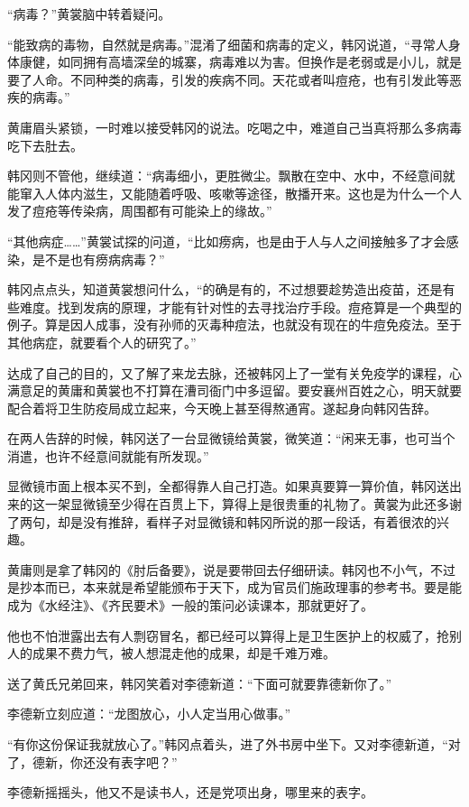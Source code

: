 “病毒？”黄裳脑中转着疑问。

“能致病的毒物，自然就是病毒。”混淆了细菌和病毒的定义，韩冈说道，“寻常人身体康健，如同拥有高墙深垒的城寨，病毒难以为害。但换作是老弱或是小儿，就是要了人命。不同种类的病毒，引发的疾病不同。天花或者叫痘疮，也有引发此等恶疾的病毒。”

黄庸眉头紧锁，一时难以接受韩冈的说法。吃喝之中，难道自己当真将那么多病毒吃下去肚去。

韩冈则不管他，继续道：“病毒细小，更胜微尘。飘散在空中、水中，不经意间就能窜入人体内滋生，又能随着呼吸、咳嗽等途径，散播开来。这也是为什么一个人发了痘疮等传染病，周围都有可能染上的缘故。”

“其他病症……”黄裳试探的问道，“比如痨病，也是由于人与人之间接触多了才会感染，是不是也有痨病病毒？”

韩冈点点头，知道黄裳想问什么，“的确是有的，不过想要趁势造出疫苗，还是有些难度。找到发病的原理，才能有针对性的去寻找治疗手段。痘疮算是一个典型的例子。算是因人成事，没有孙师的灭毒种痘法，也就没有现在的牛痘免疫法。至于其他病症，就要看个人的研究了。”

达成了自己的目的，又了解了来龙去脉，还被韩冈上了一堂有关免疫学的课程，心满意足的黄庸和黄裳也不打算在漕司衙门中多逗留。要安襄州百姓之心，明天就要配合着将卫生防疫局成立起来，今天晚上甚至得熬通宵。遂起身向韩冈告辞。

在两人告辞的时候，韩冈送了一台显微镜给黄裳，微笑道：“闲来无事，也可当个消遣，也许不经意间就能有所发现。”

显微镜市面上根本买不到，全都得靠人自己打造。如果真要算一算价值，韩冈送出来的这一架显微镜至少得在百贯上下，算得上是很贵重的礼物了。黄裳为此还多谢了两句，却是没有推辞，看样子对显微镜和韩冈所说的那一段话，有着很浓的兴趣。

黄庸则是拿了韩冈的《肘后备要》，说是要带回去仔细研读。韩冈也不小气，不过是抄本而已，本来就是希望能颁布于天下，成为官员们施政理事的参考书。要是能成为《水经注》、《齐民要术》一般的策问必读课本，那就更好了。

他也不怕泄露出去有人剽窃冒名，都已经可以算得上是卫生医护上的权威了，抢别人的成果不费力气，被人想混走他的成果，却是千难万难。

送了黄氏兄弟回来，韩冈笑着对李德新道：“下面可就要靠德新你了。”

李德新立刻应道：“龙图放心，小人定当用心做事。”

“有你这份保证我就放心了。”韩冈点着头，进了外书房中坐下。又对李德新道，“对了，德新，你还没有表字吧？”

李德新摇摇头，他又不是读书人，还是党项出身，哪里来的表字。


